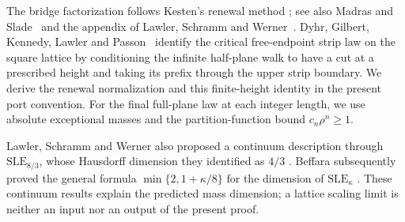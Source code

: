 The bridge factorization follows Kesten's renewal method
\cite{Kesten1963}; see also Madras and Slade~\cite{MadrasSlade1993}
and the appendix of Lawler, Schramm and Werner~\cite{LSW2004}.
Dyhr, Gilbert, Kennedy, Lawler and
Passon~\cite[Proposition 2.10]{DyhrEtAl2011} identify the critical
free-endpoint strip law on the square lattice by conditioning the
infinite half-plane walk to have a cut at a prescribed height and
taking its prefix through the upper strip boundary.
We derive the renewal normalization and this finite-height identity
in the present port convention. For the final full-plane law at each
integer length, we use absolute exceptional masses and the
partition-function bound \(c_n\rho^n\ge1\).

Lawler, Schramm and Werner also proposed a continuum description through
\(\mathrm{SLE}_{8/3}\), whose Hausdorff dimension they identified as
\(4/3\) \cite[Proposition 2(ii)]{LSW2004}. Beffara subsequently proved
the general formula \(\min\{2,1+\kappa/8\}\) for the dimension of
\(\mathrm{SLE}_{\kappa}\) \cite{Beffara2008}.
These continuum results explain the predicted mass dimension;
a lattice scaling limit is neither an input nor an output of the
present proof.
